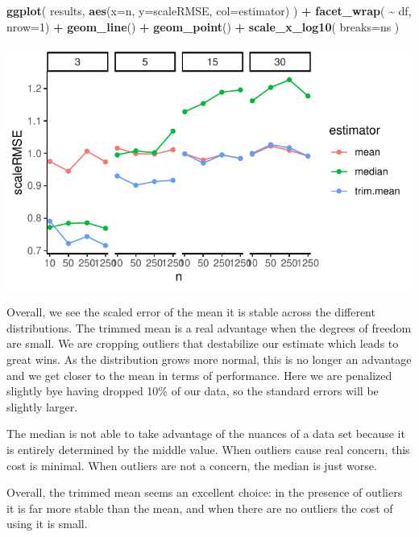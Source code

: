 \documentclass[
]{book}
\newenvironment{Shaded}{\begin{snugshade}}{\end{snugshade}}
\newcommand{\AttributeTok}[1]{\textcolor[rgb]{0.13,0.29,0.53}{#1}}
\newcommand{\DecValTok}[1]{\textcolor[rgb]{0.00,0.00,0.81}{#1}}
\newcommand{\FunctionTok}[1]{\textcolor[rgb]{0.13,0.29,0.53}{\textbf{#1}}}
\newcommand{\NormalTok}[1]{#1}
\newcommand{\SpecialCharTok}[1]{\textcolor[rgb]{0.81,0.36,0.00}{\textbf{#1}}}
\begin{document}
\begin{Shaded}
\begin{Highlighting}[]
\FunctionTok{ggplot}\NormalTok{( results, }\FunctionTok{aes}\NormalTok{(}\AttributeTok{x=}\NormalTok{n, }\AttributeTok{y=}\NormalTok{scaleRMSE, }\AttributeTok{col=}\NormalTok{estimator) ) }\SpecialCharTok{+}
    \FunctionTok{facet\_wrap}\NormalTok{( }\SpecialCharTok{\textasciitilde{}}\NormalTok{ df, }\AttributeTok{nrow=}\DecValTok{1}\NormalTok{) }\SpecialCharTok{+}
    \FunctionTok{geom\_line}\NormalTok{() }\SpecialCharTok{+} \FunctionTok{geom\_point}\NormalTok{() }\SpecialCharTok{+}
    \FunctionTok{scale\_x\_log10}\NormalTok{( }\AttributeTok{breaks=}\NormalTok{ns )}
\end{Highlighting}
\end{Shaded}

\begin{center}\includegraphics[width=0.75\linewidth]{Designing-Simulations-in-R_files/figure-latex/unnamed-chunk-185-1} \end{center}

Overall, we see the scaled error of the mean it is stable across the
different distributions. The trimmed mean is a real advantage when the
degrees of freedom are small. We are cropping outliers that destabilize our
estimate which leads to great wins. As the distribution grows more normal,
this is no longer an advantage and we get closer to the mean in terms of
performance. Here we are penalized slightly bye having dropped 10\% of our
data, so the standard errors will be slightly larger.

The median is not able to take advantage of the nuances of a data set because
it is entirely determined by the middle value. When outliers cause real
concern, this cost is minimal. When outliers are not a concern, the median is
just worse.

Overall, the trimmed mean seems an excellent choice: in the presence of
outliers it is far more stable than the mean, and when there are no outliers
the cost of using it is small.
\end{document}
